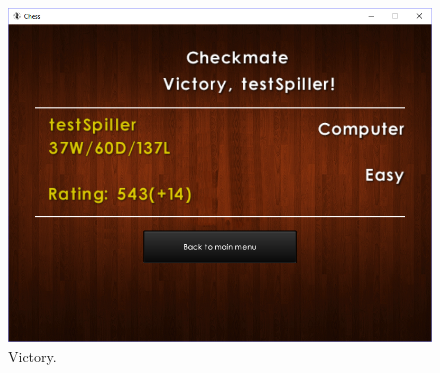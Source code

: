 \documentclass[12pt, a4paper]{article}
\begin{document}
\begin{figure}[ht!]
	\centering
	\includegraphics[width=0.8\linewidth]{figures/victory.png}
	\caption{Victory.}
\end{figure}
\end{document}
